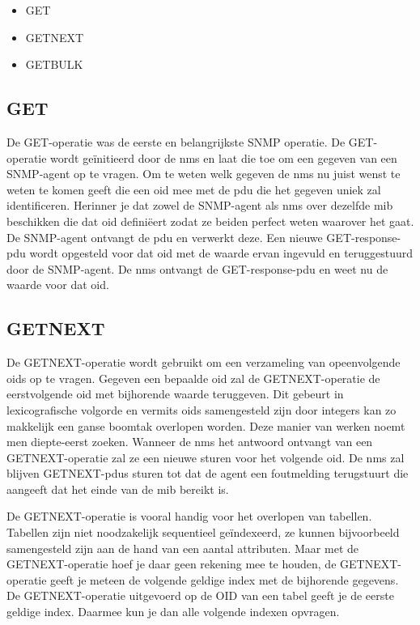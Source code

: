 \begin{minipage}{\textwidth}
	\begin{itemize}
		\item GET
		\item GETNEXT
		\item GETBULK
	\end{itemize}
\end{minipage}


\subsection{GET}
De GET-operatie was de eerste en belangrijkste SNMP operatie.
De GET-operatie wordt geïnitieerd door de \gls{nms} en laat die toe om een gegeven van een SNMP-agent op te vragen.
Om te weten welk gegeven de \gls{nms} nu juist wenst te weten te komen geeft die een \gls{oid} mee met de \gls{pdu} die het gegeven uniek zal identificeren.
Herinner je dat zowel de SNMP-agent als \gls{nms} over dezelfde \gls{mib} beschikken die dat \gls{oid} definiëert zodat ze beiden perfect weten waarover het gaat.
De SNMP-agent ontvangt de \gls{pdu} en verwerkt deze. Een nieuwe GET-response-\gls{pdu} wordt opgesteld voor dat \gls{oid} met de waarde ervan ingevuld en
teruggestuurd door de SNMP-agent. De \gls{nms} ontvangt de GET-response-\gls{pdu} en weet nu de waarde voor dat \gls{oid}.



\subsection{GETNEXT}
\label{snmp-getnext}
De GETNEXT-operatie wordt gebruikt om een verzameling van opeenvolgende \glspl{oid} op te vragen.
Gegeven een bepaalde \gls{oid} zal de GETNEXT-operatie de eerstvolgende \gls{oid} met bijhorende waarde teruggeven.
Dit gebeurt in lexicografische volgorde en vermits \glspl{oid} samengesteld zijn door integers kan zo makkelijk een ganse boomtak overlopen worden.
Deze manier van werken noemt men diepte-eerst zoeken.\cite{essentialsnmp}
Wanneer de \gls{nms} het antwoord ontvangt van een GETNEXT-operatie zal ze een nieuwe sturen voor het volgende \gls{oid}.
De \gls{nms} zal blijven GETNEXT-\glspl{pdu} sturen tot dat de agent een foutmelding terugstuurt die aangeeft dat het einde van de \gls{mib} bereikt is.

De GETNEXT-operatie is vooral handig voor het overlopen van tabellen.
Tabellen zijn niet noodzakelijk sequentieel geïndexeerd, ze kunnen bijvoorbeeld samengesteld zijn aan de hand van een aantal attributen.
Maar met de GETNEXT-operatie hoef je daar geen rekening mee te houden, de GETNEXT-operatie geeft je meteen de volgende geldige index met de bijhorende gegevens.
De GETNEXT-operatie uitgevoerd op de OID van een tabel geeft je de eerste geldige index.
Daarmee kun je dan alle volgende indexen opvragen.

